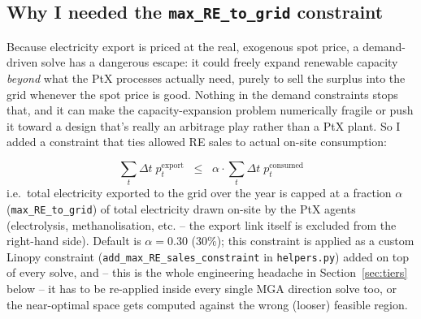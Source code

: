 \documentclass[11pt]{article}
\begin{document}
\subsection{Why I needed the \texttt{max\_RE\_to\_grid} constraint}
\label{sec:constraint}
Because electricity export is priced at the real, exogenous spot price,
a demand-driven solve has a dangerous escape: it could freely expand renewable capacity
\emph{beyond} what the PtX processes actually need, purely to sell the
surplus into the grid whenever the spot price is good. Nothing in the
demand constraints stops that, and it can make the capacity-expansion
problem numerically fragile or push it toward a design that's really an
arbitrage play rather than a PtX plant. So I added a constraint that ties
allowed RE sales to actual on-site consumption:

\begin{equation}
  \sum_{t} \Delta t\; p^{\mathrm{export}}_t
  \;\;\le\;\;
  \alpha \cdot \sum_{t} \Delta t\; p^{\mathrm{consumed}}_t
  \label{eq:maxre}
\end{equation}
i.e.\ total electricity exported to the grid over the year is capped at a
fraction $\alpha$ (\texttt{max\_RE\_to\_grid}) of total electricity drawn
on-site by the PtX agents (electrolysis, methanolisation, etc. -- the
export link itself is excluded from the right-hand side). Default is
$\alpha = 0.30$ (30\%); this constraint is applied as a custom Linopy
constraint (\texttt{add\_max\_RE\_sales\_constraint} in
\texttt{helpers.py}) added on top of every solve, and -- this is the whole
engineering headache in Section~\ref{sec:tiers} below -- it has to be
re-applied inside every single MGA direction solve too, or the near-optimal
space gets computed against the wrong (looser) feasible region.

\end{document}
